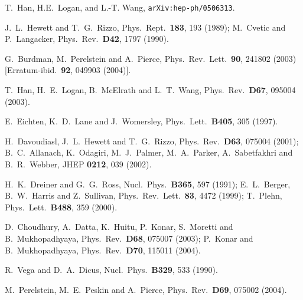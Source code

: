 \documentclass[prd,aps,floats,preprintnumbers,preprint,superscriptaddress,floatfix,nofootinbib]{revtex4}
\begin{document}
\begin{thebibliography}{99}
T.~Han,  H.E.~Logan, and L.-T. Wang,  {\tt arXiv:hep-ph/0506313}.

J.~L.~Hewett and T.~G.~Rizzo,
  Phys.\ Rept.\  {\bf 183}, 193 (1989);  M.~Cvetic and P.~Langacker,
  Phys.\ Rev.\ {\bf D42}, 1797 (1990).

G.~Burdman, M.~Perelstein and A.~Pierce,
  Phys.\ Rev.\ Lett.\  {\bf 90}, 241802 (2003)
  [Erratum-ibid.\  {\bf 92}, 049903 (2004)].

  T.~Han, H.~E.~Logan, B.~McElrath and L.~T.~Wang,
  Phys.\ Rev.\  {\bf D67}, 095004 (2003).

 E.~Eichten, K.~D.~Lane and J.~Womersley,
  Phys.\ Lett.\  {\bf B405}, 305 (1997).
 
H.~Davoudiasl, J.~L.~Hewett and T.~G.~Rizzo,
  Phys.\ Rev.\  {\bf D63}, 075004 (2001);
 B.~C.~Allanach, K.~Odagiri, M.~J.~Palmer, M.~A.~Parker, A.~Sabetfakhri and B.~R.~Webber,
  JHEP {\bf 0212}, 039 (2002).

  H.~K.~Dreiner and G.~G.~Ross,
  Nucl.\ Phys.\  {\bf B365}, 597 (1991); 
  E.~L.~Berger, B.~W.~Harris and Z.~Sullivan,
  Phys.\ Rev.\ Lett.\  {\bf 83}, 4472 (1999);
T.~Plehn, 
  Phys.\ Lett.\  {\bf B488}, 359 (2000).

 D.~Choudhury, A.~Datta, K.~Huitu, P.~Konar, S.~Moretti and B.~Mukhopadhyaya,
  Phys.\ Rev.\  {\bf D68}, 075007 (2003);
 P.~Konar and B.~Mukhopadhyaya,
  Phys.\ Rev.\  {\bf D70}, 115011 (2004).
 
 R.~Vega and D.~A.~Dicus,
  Nucl.\ Phys.\  {\bf B329}, 533 (1990).
 
 M.~Perelstein, M.~E.~Peskin and A.~Pierce,
  Phys.\ Rev.\  {\bf D69}, 075002 (2004).
 

\end{thebibliography}
\end{document}
